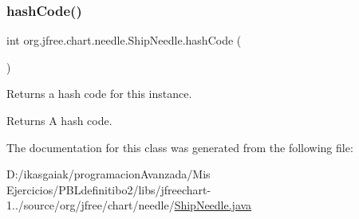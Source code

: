 \subsubsection{\texorpdfstring{hash\+Code()}{hashCode()}}
{\footnotesize\ttfamily int org.\+jfree.\+chart.\+needle.\+Ship\+Needle.\+hash\+Code (\begin{DoxyParamCaption}{ }\end{DoxyParamCaption})}

Returns a hash code for this instance.

\begin{DoxyReturn}{Returns}
A hash code. 
\end{DoxyReturn}


The documentation for this class was generated from the following file\+:\begin{DoxyCompactItemize}
\item 
D\+:/ikasgaiak/programacion\+Avanzada/\+Mis Ejercicios/\+P\+B\+Ldefinitibo2/libs/jfreechart-\/1../source/org/jfree/chart/needle/\mbox{\hyperlink{_ship_needle_8java}{Ship\+Needle.\+java}}\end{DoxyCompactItemize}
